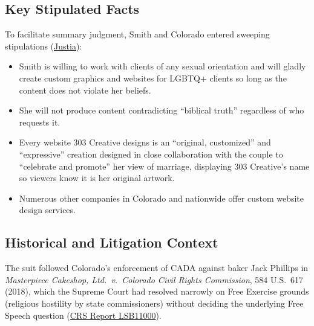 \documentclass[12pt]{article}
\begin{document}
\subsection*{Key Stipulated Facts}
To facilitate summary judgment, Smith and Colorado entered sweeping stipulations (\href{https://supreme.justia.com/cases/federal/us/600/21-476/}{Justia}):
\begin{itemize}
  \item Smith is willing to work with clients of any sexual orientation and will gladly create custom graphics and websites for LGBTQ+ clients so long as the content does not violate her beliefs.
  \item She will not produce content contradicting ``biblical truth'' regardless of who requests it.
  \item Every website 303 Creative designs is an ``original, customized'' and ``expressive'' creation designed in close collaboration with the couple to ``celebrate and promote'' her view of marriage, displaying 303 Creative's name so viewers know it is her original artwork.
  \item Numerous other companies in Colorado and nationwide offer custom website design services.
\end{itemize}

\subsection*{Historical and Litigation Context}
The suit followed Colorado's enforcement of CADA against baker Jack Phillips in \textit{Masterpiece Cakeshop, Ltd.\ v.\ Colorado Civil Rights Commission}, 584 U.S.\ 617 (2018), which the Supreme Court had resolved narrowly on Free Exercise grounds (religious hostility by state commissioners) without deciding the underlying Free Speech question (\href{https://www.everycrsreport.com/reports/LSB11000.html}{CRS Report LSB11000}).
\end{document}
